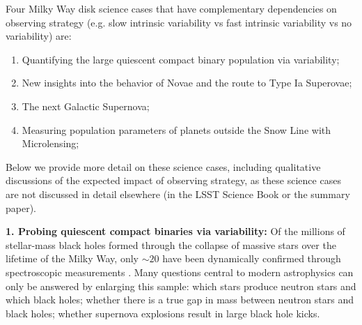 

Four Milky Way disk science cases that have complementary dependencies on
observing strategy (e.g. slow intrinsic variability vs fast intrinsic
variability vs no variability) are: 

\begin{enumerate}
  \item Quantifying the large quiescent compact binary population via variability;
  \item New insights into the behavior of Novae and the route to Type Ia Superovae;
  \item The next Galactic Supernova;
  \item Measuring population parameters of planets outside the Snow Line with Microlensing;
\end{enumerate}

Below we provide more detail on these science cases, including
qualitative discussions of the expected impact of observing
strategy, as these science cases are not discussed in detail elsewhere
(in the LSST Science Book or the \citet{IvezicEtal2008} summary paper).  


{\bf 1. Probing quiescent compact binaries via variability:} Of the
millions of stellar-mass black holes formed through the collapse of
massive stars over the lifetime of the Milky Way, only $\sim 20$ have
been dynamically confirmed through spectroscopic measurements
\citep[e.g.,][]{2015arXiv151008869C}.  Many questions central to modern
astrophysics can only be answered by enlarging this sample: which
stars produce neutron stars and which black holes; whether there is a
true gap in mass between neutron stars and black holes; whether
supernova explosions result in large black hole kicks.


